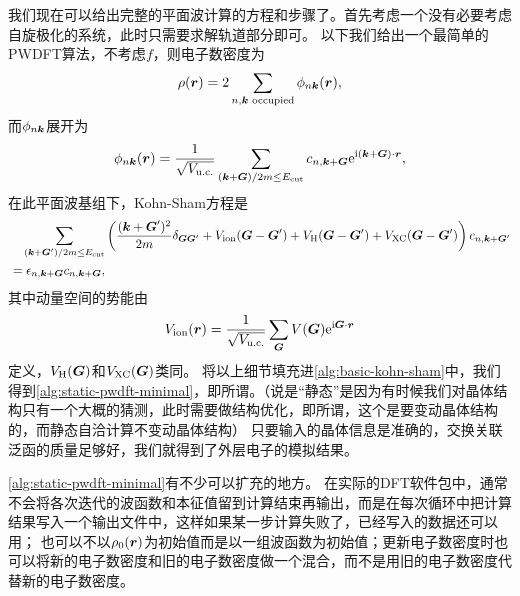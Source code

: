 我们现在可以给出完整的平面波计算的方程和步骤了。首先考虑一个没有必要考虑自旋极化的系统，此时只需要求解轨道部分即可。
以下我们给出一个最简单的PWDFT算法，不考虑$f$，则电子数密度为
\begin{equation}
    \rho(\vb*{r}) = 2 \sum_{n, \vb*{k} \text{ occupied}}  \phi_{n \vb*{k}}(\vb*{r}),
    \label{eq:kohn-sham-density-pw-minimal}
\end{equation}
而$\phi_{n \vb*{k}}$展开为
\begin{equation}
    \phi_{n \vb*{k}}(\vb*{r}) = \frac{1}{\sqrt{V_\text{u.c.}}} \sum_{(\vb*{k} + \vb*{G}) / 2m \leq E_\text{cut}} c_{n, \vb*{k} + \vb*{G}} \mathrm{e}^{\mathrm{i} (\vb*{k} + \vb*{G}) \cdot \vb*{r}},
    \label{eq:pw-minimal-expand}
\end{equation}
在此平面波基组下，Kohn-Sham方程是
\begin{equation}
    \begin{aligned}
        &\quad \sum_{( \vb*{k} + \vb*{G}') / 2m \leq E_\text{cut} } \left( \frac{(\vb*{k} + \vb*{G}') ^2}{2m} \delta_{\vb*{G} \vb*{G}'} + V_\text{ion}(\vb*{G} - \vb*{G}') + V_\text{H}(\vb*{G} - \vb*{G}') + V_\text{XC}(\vb*{G} - \vb*{G}') \right) c_{n, \vb*{k} + \vb*{G}'} \\
        &= \epsilon_{n, \vb*{k} + \vb*{G}} c_{n, \vb*{k} + \vb*{G}},
    \end{aligned}
    \label{eq:kohn-sham-eq-pw-minimal}
\end{equation}
其中动量空间的势能由
\begin{equation}
    V_\text{ion}(\vb*{r}) = \frac{1}{\sqrt{V_\text{u.c.}}} \sum_{\vb*{G}} V(\vb*{G}) \mathrm{e}^{\mathrm{i} \vb*{G} \cdot \vb*{r}}
    \label{eq:momentum-space-potential-dft}
\end{equation}
定义，$V_\text{H}(\vb*{G})$和$V_\text{XC}(\vb*{G})$类同。
将以上细节填充进\autoref{alg:basic-kohn-sham}中，我们得到\autoref{alg:static-pwdft-minimal}，即所谓。（说是“静态”是因为有时候我们对晶体结构只有一个大概的猜测，此时需要做结构优化，即所谓，这个是要变动晶体结构的，而静态自洽计算不变动晶体结构）
只要输入的晶体信息是准确的，交换关联泛函的质量足够好，我们就得到了外层电子的模拟结果。

\autoref{alg:static-pwdft-minimal}有不少可以扩充的地方。
在实际的DFT软件包中，通常不会将各次迭代的波函数和本征值留到计算结束再输出，而是在每次循环中把计算结果写入一个输出文件中，这样如果某一步计算失败了，已经写入的数据还可以用；
也可以不以$\rho_0(\vb*{r})$为初始值而是以一组波函数为初始值；更新电子数密度时也可以将新的电子数密度和旧的电子数密度做一个混合，而不是用旧的电子数密度代替新的电子数密度。

